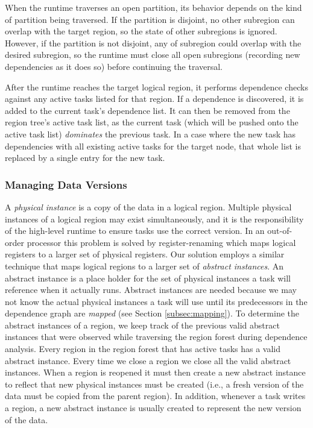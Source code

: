 When the runtime traverses an open partition, its behavior depends on the kind
of partition being traversed.  If the partition is disjoint, no other subregion
can overlap with the target region, so the state of other subregions is
ignored.  However, if the partition is not disjoint, any 
of subregion could overlap with the desired subregion, so
the runtime must close all open subregions (recording new dependencies
as it does so) before continuing the traversal.

After the runtime reaches the target logical region, it performs dependence
checks against any active tasks listed for that region.  If a dependence is 
discovered, it is added to the current task's dependence list.  It can then
be removed from the region tree's active task list, as the current task (which
will be pushed onto the active task list) {\em dominates} the previous task.
In a case where the new task has dependencies with all existing active tasks
for the target node, that whole list is replaced by a single entry for the
new task.

\subsubsection{Managing Data Versions}
\label{subsec:dataflow}

A {\em physical instance} is a copy of the data in a logical region.  Multiple
physical instances of a logical region may exist simultaneously, and it is the responsibility of the high-level runtime
to ensure tasks use the correct version.
In an out-of-order processor this problem is solved by register-renaming which maps logical
registers to a larger set of physical registers.  Our solution employs a similar technique
that maps logical regions to a larger set of {\em abstract instances}.  An abstract instance
is a place holder for the set of physical instances a task will reference when it actually runs.  
Abstract instances are needed because we may not know the actual physical instances a task will
use until its predecessors in the dependence graph are {\em mapped} 
(see Section \ref{subsec:mapping}).  
To determine the abstract instances of a region, we keep track of 
the previous valid abstract instances that were observed while traversing the region forest
during dependence analysis.  Every region in the region forest that has active tasks
has a valid abstract instance.  Every time we close a region we close all the valid
abstract instances.  When a region is reopened it must then create a new abstract instance
to reflect that new physical instances must be created (i.e., a fresh version of the data must be copied from
the parent region).  In addition, whenever a task writes a region, a new abstract instance is usually created
to represent the new version of the data.


